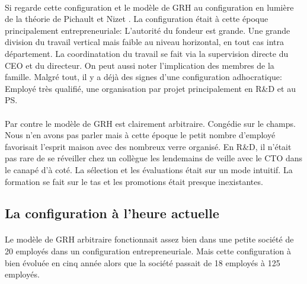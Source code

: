 \paragraph{}Si regarde cette configuration et le modèle de GRH au configuration en lumière de la théorie de Pichault et Nizet \citep[pp. 48-49]{pichault}.
La configuration était à cette époque principalement entrepreneuriale: L'autorité du fondeur est grande. Une grande division du travail vertical mais faible au niveau horizontal, en tout cas intra département. La coordinatation du travail se fait via la supervision directe du CEO et du directeur. On peut aussi noter l'implication des membres de la famille. Malgré tout, il y a déjà des signes d'une configuration adhocratique: Employé très qualifié, une organisation par projet principalement en R\&D et au PS. 

\paragraph{}Par contre le modèle de GRH est clairement arbitraire\citep[pp. 115-119]{pichault}. Congédie sur le champs. Nous n'en avons pas parler mais à cette époque le petit nombre d'employé favorisait l'esprit maison avec des nombreux verre organisé. En R\&D, il n'était pas rare de se réveiller chez un collègue les lendemains de veille avec le CTO dans le canapé d'à coté. La sélection et les évaluations était sur un mode intuitif.  La formation se fait sur le tas et les promotions était presque inexistantes. 

\subsection{La configuration à l'heure actuelle}
\paragraph{} Le modèle de GRH arbitraire fonctionnait assez bien dans une petite société de 20 employés dans un configuration entrepreneuriale. Mais cette configuration à bien évoluée en cinq année alors que la société passait de 18 employés à 125 employés. 

